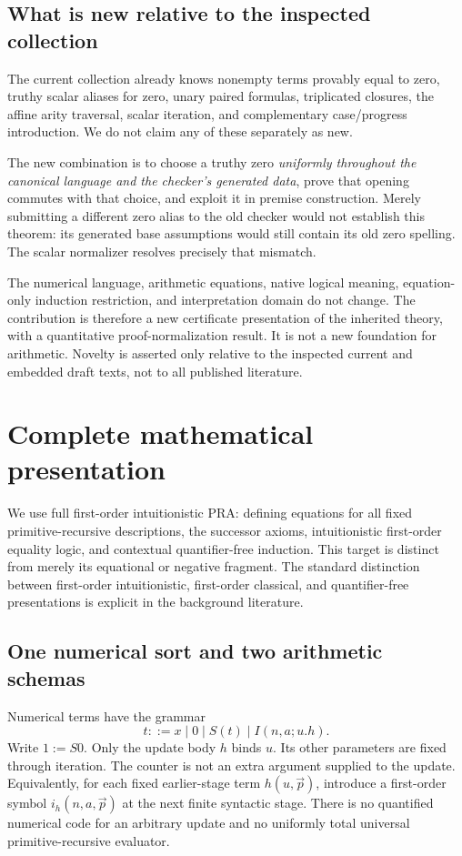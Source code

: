 \documentclass[11pt,letterpaper]{article}
\theoremstyle{definition}\newtheorem{definition}[theorem]{Definition}
\theoremstyle{remark}\newtheorem{remark}[theorem]{Remark}
\begin{document}
\subsection{What is new relative to the inspected collection}

The current collection already knows nonempty terms provably equal to zero,
truthy scalar aliases for zero, unary paired formulas, triplicated closures,
the affine arity traversal, scalar iteration, and complementary case/progress
introduction. We do not claim any of these separately as new.

The new combination is to choose a truthy zero \emph{uniformly throughout
the canonical language and the checker's generated data}, prove that opening
commutes with that choice, and exploit it in premise construction. Merely
submitting a different zero alias to the old checker would not establish
this theorem: its generated base assumptions would still contain its old
zero spelling. The scalar normalizer resolves precisely that mismatch.

The numerical language, arithmetic equations, native logical meaning,
equation-only induction restriction, and interpretation domain do not change.
The contribution is therefore a new certificate presentation of the inherited
theory, with a quantitative proof-normalization result. It is not a new
foundation for arithmetic. Novelty is asserted only relative to the inspected
current and embedded draft texts, not to all published literature.

\section{Complete mathematical presentation}
\label{sec:axioms}

We use full first-order intuitionistic PRA: defining equations for all
fixed primitive-recursive descriptions, the successor axioms, intuitionistic
first-order equality logic, and contextual quantifier-free induction.
This target is distinct from merely its equational or negative fragment.
The standard distinction between first-order intuitionistic, first-order
classical, and quantifier-free presentations is explicit in the background
literature.\cite{avigad}

\subsection{One numerical sort and two arithmetic schemas}

Numerical terms have the grammar
\[
 t::=x\mid 0\mid S(t)\mid I(n,a;u.h).
\]
Write $1:=S0$. Only the update body $h$ binds $u$. Its other parameters are fixed through
iteration. The counter is not an extra argument supplied to the update.
Equivalently, for each fixed earlier-stage term $h(u,\vec p)$, introduce
a first-order symbol $i_h(n,a,\vec p)$ at the next finite syntactic stage.
There is no quantified numerical code for an arbitrary update and no
uniformly total universal primitive-recursive evaluator.
\end{document}
